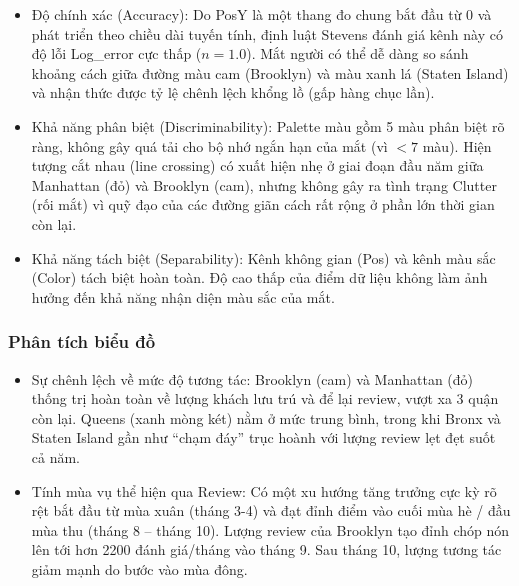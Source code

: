 \begin{itemize}
    \item Độ chính xác (Accuracy): Do PosY là một thang đo chung bắt đầu từ 0 và phát triển theo chiều dài tuyến tính, định luật Stevens đánh giá kênh này có độ lỗi Log\_error cực thấp ($n = 1.0$). Mắt người có thể dễ dàng so sánh khoảng cách giữa đường màu cam (Brooklyn) và màu xanh lá (Staten Island) và nhận thức được tỷ lệ chênh lệch khổng lồ (gấp hàng chục lần).
    \item Khả năng phân biệt (Discriminability): Palette màu gồm 5 màu phân biệt rõ ràng, không gây quá tải cho bộ nhớ ngắn hạn của mắt (vì $< 7$ màu). Hiện tượng cắt nhau (line crossing) có xuất hiện nhẹ ở giai đoạn đầu năm giữa Manhattan (đỏ) và Brooklyn (cam), nhưng không gây ra tình trạng Clutter (rối mắt) vì quỹ đạo của các đường giãn cách rất rộng ở phần lớn thời gian còn lại.
    \item Khả năng tách biệt (Separability): Kênh không gian (Pos) và kênh màu sắc (Color) tách biệt hoàn toàn. Độ cao thấp của điểm dữ liệu không làm ảnh hưởng đến khả năng nhận diện màu sắc của mắt.
\end{itemize}

\subsubsection{Phân tích biểu đồ}

\begin{itemize}
    \item Sự chênh lệch về mức độ tương tác: Brooklyn (cam) và Manhattan (đỏ) thống trị hoàn toàn về lượng khách lưu trú và để lại review, vượt xa 3 quận còn lại. Queens (xanh mòng két) nằm ở mức trung bình, trong khi Bronx và Staten Island gần như ``chạm đáy'' trục hoành với lượng review lẹt đẹt suốt cả năm.
    \item Tính mùa vụ thể hiện qua Review: Có một xu hướng tăng trưởng cực kỳ rõ rệt bắt đầu từ mùa xuân (tháng 3-4) và đạt đỉnh điểm vào cuối mùa hè / đầu mùa thu (tháng 8 -- tháng 10). Lượng review của Brooklyn tạo đỉnh chóp nón lên tới hơn 2200 đánh giá/tháng vào tháng 9. Sau tháng 10, lượng tương tác giảm mạnh do bước vào mùa đông.
\end{itemize}
